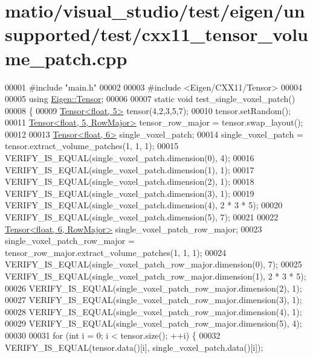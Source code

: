 \hypertarget{matio_2visual__studio_2test_2eigen_2unsupported_2test_2cxx11__tensor__volume__patch_8cpp_source}{}\section{matio/visual\+\_\+studio/test/eigen/unsupported/test/cxx11\+\_\+tensor\+\_\+volume\+\_\+patch.cpp}
\label{matio_2visual__studio_2test_2eigen_2unsupported_2test_2cxx11__tensor__volume__patch_8cpp_source}

\begin{DoxyCode}
00001 \textcolor{preprocessor}{#include "main.h"}
00002 
00003 \textcolor{preprocessor}{#include <Eigen/CXX11/Tensor>}
00004 
00005 \textcolor{keyword}{using} \hyperlink{class_eigen_1_1_tensor}{Eigen::Tensor};
00006 
00007 \textcolor{keyword}{static} \textcolor{keywordtype}{void} test\_single\_voxel\_patch()
00008 \{
00009   \hyperlink{class_eigen_1_1_tensor}{Tensor<float, 5>} tensor(4,2,3,5,7);
00010   tensor.setRandom();
00011   \hyperlink{class_eigen_1_1_tensor}{Tensor<float, 5, RowMajor>} tensor\_row\_major = tensor.swap\_layout();
00012 
00013   \hyperlink{class_eigen_1_1_tensor}{Tensor<float, 6>} single\_voxel\_patch;
00014   single\_voxel\_patch = tensor.extract\_volume\_patches(1, 1, 1);
00015   VERIFY\_IS\_EQUAL(single\_voxel\_patch.dimension(0), 4);
00016   VERIFY\_IS\_EQUAL(single\_voxel\_patch.dimension(1), 1);
00017   VERIFY\_IS\_EQUAL(single\_voxel\_patch.dimension(2), 1);
00018   VERIFY\_IS\_EQUAL(single\_voxel\_patch.dimension(3), 1);
00019   VERIFY\_IS\_EQUAL(single\_voxel\_patch.dimension(4), 2 * 3 * 5);
00020   VERIFY\_IS\_EQUAL(single\_voxel\_patch.dimension(5), 7);
00021 
00022   \hyperlink{class_eigen_1_1_tensor}{Tensor<float, 6, RowMajor>} single\_voxel\_patch\_row\_major;
00023   single\_voxel\_patch\_row\_major = tensor\_row\_major.extract\_volume\_patches(1, 1, 1);
00024   VERIFY\_IS\_EQUAL(single\_voxel\_patch\_row\_major.dimension(0), 7);
00025   VERIFY\_IS\_EQUAL(single\_voxel\_patch\_row\_major.dimension(1), 2 * 3 * 5);
00026   VERIFY\_IS\_EQUAL(single\_voxel\_patch\_row\_major.dimension(2), 1);
00027   VERIFY\_IS\_EQUAL(single\_voxel\_patch\_row\_major.dimension(3), 1);
00028   VERIFY\_IS\_EQUAL(single\_voxel\_patch\_row\_major.dimension(4), 1);
00029   VERIFY\_IS\_EQUAL(single\_voxel\_patch\_row\_major.dimension(5), 4);
00030 
00031   \textcolor{keywordflow}{for} (\textcolor{keywordtype}{int} i = 0; i < tensor.size(); ++i) \{
00032     VERIFY\_IS\_EQUAL(tensor.data()[i], single\_voxel\_patch.data()[i]);

\end{DoxyCode}
